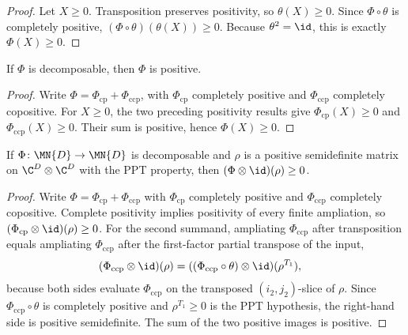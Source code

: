 \begin{proof}
    \leanok
    Let $X\ge0$. Transposition preserves positivity, so $\theta(X)\ge0$.
    Since $\Phi\circ\theta$ is completely positive,
    $(\Phi\circ\theta)(\theta(X))\ge0$. Because $\theta^2=\id$, this is exactly
    $\Phi(X)\ge0$.
\end{proof}

\begin{lemma}
    \label{lem:decomposable_map_positive}
    \leanok
    If $\Phi$ is decomposable, then $\Phi$ is positive.
\end{lemma}

\begin{proof}
    \leanok
    Write $\Phi=\Phi_{\mathrm{cp}}+\Phi_{\mathrm{ccp}}$, with
    $\Phi_{\mathrm{cp}}$ completely positive and
    $\Phi_{\mathrm{ccp}}$ completely copositive. For $X\ge0$, the two preceding
    positivity results give $\Phi_{\mathrm{cp}}(X)\ge0$ and
    $\Phi_{\mathrm{ccp}}(X)\ge0$. Their sum is positive, hence
    $\Phi(X)\ge0$.
\end{proof}

\begin{theorem}
    \label{thm:decomposable_map_tensor_id_ppt}
    \leanok
    If $\Phi\colon\MN{D}\to\MN{D}$ is decomposable and $\rho$ is a positive
    semidefinite matrix on $\C^{D}\otimes\C^{D}$ with the PPT property, then
    $(\Phi\otimes\id)(\rho)\ge0$.
\end{theorem}

\begin{proof}
    \leanok
    Write $\Phi=\Phi_{\mathrm{cp}}+\Phi_{\mathrm{ccp}}$ with
    $\Phi_{\mathrm{cp}}$ completely positive and $\Phi_{\mathrm{ccp}}$
    completely copositive. Complete positivity implies positivity of every
    finite ampliation, so
    $(\Phi_{\mathrm{cp}}\otimes\id)(\rho)\ge0$. For the second summand,
    ampliating $\Phi_{\mathrm{ccp}}$ after transposition equals ampliating $\Phi_{\mathrm{ccp}}$ after the first-factor partial transpose
    of the input,
    \begin{align}
        (\Phi_{\mathrm{ccp}}\otimes\id)(\rho)
         & =((\Phi_{\mathrm{ccp}}\circ\theta)\otimes\id)(\rho^{T_{1}}),
        \notag
    \end{align}
    because both sides evaluate $\Phi_{\mathrm{ccp}}$ on the transposed
    $(i_{2},j_{2})$-slice of $\rho$. Since $\Phi_{\mathrm{ccp}}\circ\theta$ is
    completely positive and $\rho^{T_{1}}\ge0$ is the PPT hypothesis, the
    right-hand side is positive semidefinite. The sum of the two positive
    images is positive.
\end{proof}

